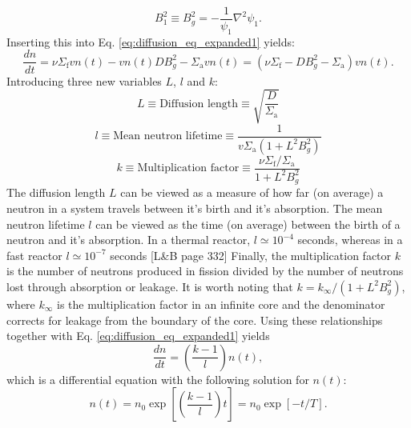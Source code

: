 \begin{equation}
	B_1^2 \equiv B_g^2 = -\frac{1}{\psi_1}\nabla^2\psi_1.				%
\end{equation}
Inserting this into Eq. \ref{eq:diffusion_eq_expanded1} yields:
\begin{equation}
	\frac{d n}{d t} = \nu \Sigma_\text{f}v n(t) - v n(t) D B_g^2 - \Sigma_\text{a}v n(t) = (\nu \Sigma_\text{f} - D B_g^2 - \Sigma_\text{a})v n(t).
	\label{eq:diffusion_eq_expanded2}
\end{equation}
Introducing three new variables $L$, $l$ and $k$:
\begin{equation}
	L \equiv \text{Diffusion length} \equiv \sqrt{\frac{D}{\Sigma_\text{a}}}
\end{equation}
\begin{equation}
	l \equiv \text{Mean neutron lifetime} \equiv \frac{1}{v \Sigma_\text{a}(1 + L^2 B_g^2)}
\end{equation}
\begin{equation}
	k \equiv \text{Multiplication factor} \equiv \frac{\nu \Sigma_\text{f}/\Sigma_\text{a}}{1 + L^2 B_g^2}
\end{equation}
The diffusion length $L$ can be viewed as a measure of how far (on average) a neutron in a system travels between it's birth and it's absorption. The mean neutron lifetime $l$ can be viewed as the time (on average) between the birth of a neutron and it's absorption. In a thermal reactor, $l \simeq 10^{-4}$ seconds, whereas in a fast reactor $l \simeq 10^{-7}$ seconds [L\&B page 332] Finally, the multiplication factor $k$ is the number of neutrons produced in fission divided by the number of neutrons lost through absorption or leakage. It is worth noting that $k = k_\infty/(1 + L^2 B_g^2)$, where $k_\infty$ is the multiplication factor in an infinite core and the denominator corrects for leakage from the boundary of the core. Using these relationships together with Eq. \ref{eq:diffusion_eq_expanded1} yields
\begin{equation}
	\frac{dn}{dt} = \left( \frac{k - 1}{l} \right) n(t),
	\label{eq:diffusion_eq_expanded3}
\end{equation}
which is a differential equation with the following solution for $n(t)$:
\begin{equation}
	n(t) = n_0 \exp \left[\left(\frac{k-1}{l}\right)t\right] = n_0 \exp[-t/T].
	\label{eq:diffusion_eq_expanded4}
\end{equation}
